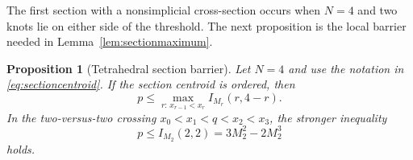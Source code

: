 \documentclass[11pt]{article}
\newtheorem{proposition}[theorem]{Proposition}
\theoremstyle{definition}
\begin{document}
The first section with a nonsimplicial cross-section occurs when $N=4$ and
two knots lie on either side of the threshold.  The next proposition is the
local barrier needed in Lemma~\ref{lem:sectionmaximum}.

\begin{proposition}[Tetrahedral section barrier]\label{prop:tetrahedralbarrier}
Let $N=4$ and use the notation in \eqref{eq:sectioncentroid}.  If the section
centroid is ordered, then
\begin{equation}\label{eq:tetrahedralbarrier}
 p\le\max_{r:\,x_{r-1}<x_r}I_{M_r}(r,4-r).
\end{equation}
In the two-versus-two crossing $x_0<x_1<q<x_2<x_3$, the stronger inequality
\[
 p\le I_{M_2}(2,2)=3M_2^2-2M_2^3
\]
holds.
\end{proposition}
\end{document}
